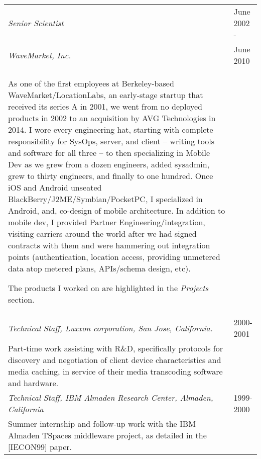 \begin{tabular}{p{5.2in}@{\hspace{1.5cm}}l}
	  
	\em Senior Scientist     & June 2002 -  \\
	\em  WaveMarket, Inc. 	& June 2010 \\[4pt]
	
	   As one of the first employees at Berkeley-based WaveMarket/LocationLabs,
	   an early-stage startup that received its series A in 2001, 
	   we went from no deployed products in 2002 to an
	   acquisition by AVG Technologies in 2014.  I wore every engineering hat, starting with complete responsibility
	   for SysOps, server, and client -- writing tools and software for all three -- to
	   then specializing in Mobile Dev as we grew from a dozen engineers, added sysadmin, grew 
	   to thirty engineers, and finally to one hundred.  
	   Once iOS and Android unseated BlackBerry/J2ME/Symbian/PocketPC,
	   I specialized in Android, and, co-design of mobile architecture.  In addition to mobile dev, I provided
	   Partner Engineering/integration, visiting carriers around the world after we had signed contracts
	   with them and were hammering out integration points (authentication, location access, 
	   providing unmetered data atop metered plans, APIs/schema design, etc).
	   \smallskip

	   The products I worked on are highlighted in the {\em Projects} section. \\[9pt]
       	  
    \em Technical Staff, Luxxon corporation, San Jose, California. & 2000-2001 \\[3pt]
       Part-time work assisting with R\&D, specifically
       protocols for discovery and negotiation of client
       device characteristics and media caching, in service of their media transcoding
       software and hardware. \\[9pt]

    \em Technical Staff, IBM Almaden Research Center, 
          Almaden, California                         & 1999-2000 \\[3pt]
       Summer internship and follow-up work with
       the IBM Almaden TSpaces middleware project, as detailed in the [IECON99] paper. \\[9pt]


\end{tabular}



